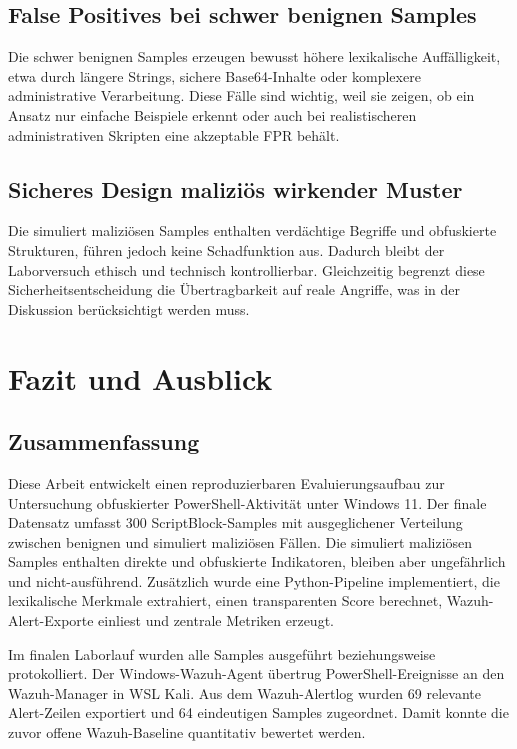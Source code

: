 \documentclass[12pt,a4paper,oneside,parskip=half]{scrreprt}
\begin{document}
\section{False Positives bei schwer benignen Samples}
Die schwer benignen Samples erzeugen bewusst höhere lexikalische Auffälligkeit, etwa durch längere Strings, sichere Base64-Inhalte oder komplexere administrative Verarbeitung. Diese Fälle sind wichtig, weil sie zeigen, ob ein Ansatz nur einfache Beispiele erkennt oder auch bei realistischeren administrativen Skripten eine akzeptable FPR behält.

\section{Sicheres Design maliziös wirkender Muster}
Die simuliert maliziösen Samples enthalten verdächtige Begriffe und obfuskierte Strukturen, führen jedoch keine Schadfunktion aus. Dadurch bleibt der Laborversuch ethisch und technisch kontrollierbar. Gleichzeitig begrenzt diese Sicherheitsentscheidung die Übertragbarkeit auf reale Angriffe, was in der Diskussion berücksichtigt werden muss.

\chapter{Fazit und Ausblick}

\section{Zusammenfassung}
Diese Arbeit entwickelt einen reproduzierbaren Evaluierungsaufbau zur Untersuchung obfuskierter PowerShell-Aktivität unter Windows 11. Der finale Datensatz umfasst 300 ScriptBlock-Samples mit ausgeglichener Verteilung zwischen benignen und simuliert maliziösen Fällen. Die simuliert maliziösen Samples enthalten direkte und obfuskierte Indikatoren, bleiben aber ungefährlich und nicht-ausführend. Zusätzlich wurde eine Python-Pipeline implementiert, die lexikalische Merkmale extrahiert, einen transparenten Score berechnet, Wazuh-Alert-Exporte einliest und zentrale Metriken erzeugt.

Im finalen Laborlauf wurden alle Samples ausgeführt beziehungsweise protokolliert. Der Windows-Wazuh-Agent übertrug PowerShell-Ereignisse an den Wazuh-Manager in WSL Kali. Aus dem Wazuh-Alertlog wurden 69 relevante Alert-Zeilen exportiert und 64 eindeutigen Samples zugeordnet. Damit konnte die zuvor offene Wazuh-Baseline quantitativ bewertet werden.
\end{document}
